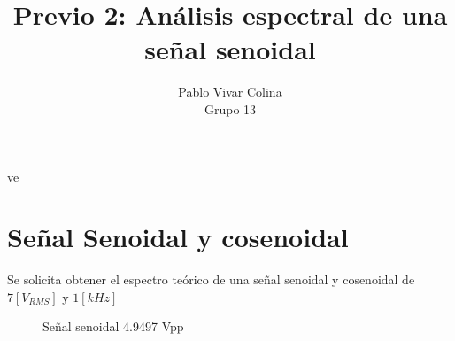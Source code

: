 ve\documentclass{article}
\title{Previo 2: Análisis espectral de una señal senoidal}
\author{Pablo Vivar Colina\\
Grupo 13
}
\begin{document}
\maketitle

\section{Señal Senoidal y cosenoidal}

Se solicita obtener el espectro teórico de una señal senoidal y cosenoidal de $7 [V_{RMS}]$ y $1 [kHz]$

\begin{figure}[h!]
    \centering
    
   

\caption{Señal senoidal 4.9497 Vpp}
    \label{fig:seno4.9497.1khzprim}
\end{figure}





\end{document}
